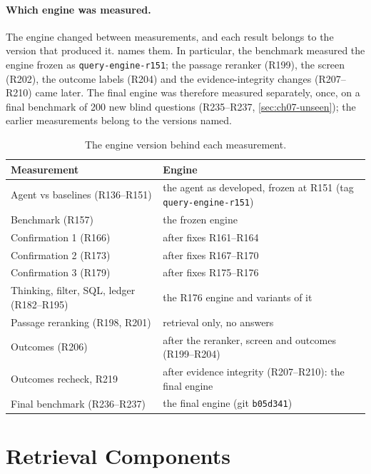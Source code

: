 \paragraph{Which engine was measured.} The engine changed between measurements, and each result belongs to the
version that produced it.  names them. In particular, the benchmark measured the engine
frozen as \texttt{query-engine-r151}; the passage reranker (R199), the screen (R202), the outcome labels (R204) and the
evidence-integrity changes (R207--R210) came later. The final engine was therefore measured separately, once, on a
final benchmark of 200 new blind questions (R235--R237, \cref{sec:ch07-unseen}); the earlier measurements belong to
the versions named.

\begin{table}[htbp]
\centering
\caption{The engine version behind each measurement.}
\label{tab:engine-versions}
\small
\begin{tabularx}{\linewidth}{@{}l>{\raggedright\arraybackslash}X@{}}
\toprule
Measurement & Engine \\
\midrule
Agent vs baselines (R136--R151) & the agent as developed, frozen at R151 (tag \texttt{query-engine-r151}) \\
Benchmark (R157) & the frozen engine \\
Confirmation 1 (R166) & after fixes R161--R164 \\
Confirmation 2 (R173) & after fixes R167--R170 \\
Confirmation 3 (R179) & after fixes R175--R176 \\
Thinking, filter, SQL, ledger (R182--R195) & the R176 engine and variants of it \\
Passage reranking (R198, R201) & retrieval only, no answers \\
Outcomes (R206) & after the reranker, screen and outcomes (R199--R204) \\
Outcomes recheck, R219 & after evidence integrity (R207--R210): the final engine \\
Final benchmark (R236--R237) & the final engine (git \texttt{b05d341}) \\
\bottomrule
\end{tabularx}
\end{table}

\section{Retrieval Components}\label{sec:ch07-retrieval}

